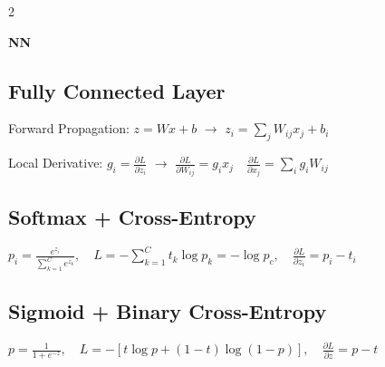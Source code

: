 \documentclass[a4paper]{article}
\newcommand{\module}[1]{\par\needspace{45pt}\addvspace{4pt}\noindent\colorbox{accent}{\parbox{\dimexpr\linewidth-2\fboxsep\relax}{\color{white}\sffamily\bfseries\fontsize{10}{12}\selectfont #1}}\par\vspace{1pt}}
\newcommand{\bodyfont}{\fontsize{7.7}{9}\selectfont}
\let\originalsum\sum
\renewcommand{\sum}{\mathop{\textstyle\originalsum}\nolimits}
\begin{document}
\bodyfont\raggedcolumns
\begin{multicols}{2}
\module{NN}
\subsection*{Fully Connected Layer}
\noindent Forward Propagation: \(\displaystyle z=Wx+b\) \(\to\) \(\displaystyle z_i=\sum_jW_{ij}x_j+b_i\)\par
\noindent Local Derivative: \(\displaystyle g_i=\frac{\partial L}{\partial z_i}\) \(\to\) \(\displaystyle \frac{\partial L}{\partial W_{ij}}=g_ix_j \quad \frac{\partial L}{\partial x_j}=\sum_i g_iW_{ij}\)\par
\subsection*{Softmax + Cross-Entropy}
\noindent \(\displaystyle p_i=\frac{e^{z_i}}{\sum_{k=1}^{C}e^{z_k}},\quad L=-\sum_{k=1}^{C}t_k\log p_k=-\log p_c,\quad \frac{\partial L}{\partial z_i}=p_i-t_i\)\par
\subsection*{Sigmoid + Binary Cross-Entropy}
\noindent \(\displaystyle p=\frac{1}{1+e^{-z}},\quad L=-[t\log p+(1-t)\log(1-p)],\quad \frac{\partial L}{\partial z}=p-t\)\par

\end{multicols}
\end{document}
